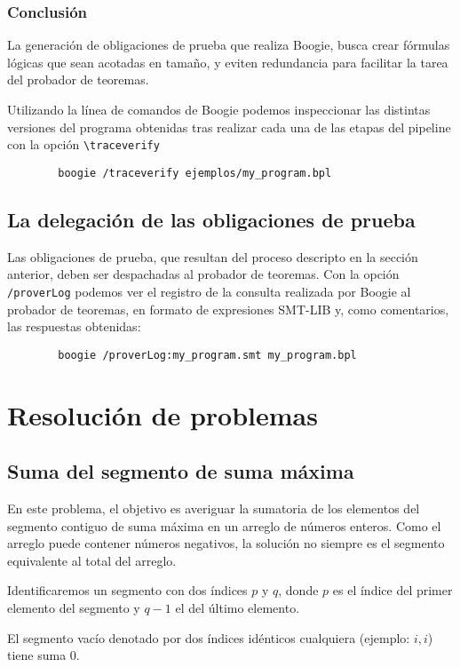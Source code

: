 \documentclass[12pt, a4paper, openany, fleqn]{book}
\begin{document}
    \subsection*{Conclusión}

    La generación de obligaciones de prueba que realiza Boogie, busca crear fórmulas lógicas que sean acotadas en tamaño, y eviten redundancia para facilitar la tarea del probador de teoremas.
  
    Utilizando la línea de comandos de Boogie podemos inspeccionar las distintas versiones del programa obtenidas tras realizar cada una de las etapas del pipeline con la opción \verb|\traceverify|
    \begin{verbatim}
        boogie /traceverify ejemplos/my_program.bpl
    \end{verbatim}

    \section{La delegación de las obligaciones de prueba}
    Las obligaciones de prueba, que resultan del proceso descripto en la sección anterior, deben ser despachadas al probador de teoremas.
    Con la opción \verb|/proverLog| podemos ver el registro de la consulta realizada por Boogie al probador de teoremas, en formato de expresiones SMT-LIB y, como comentarios, las respuestas obtenidas:
    \begin{verbatim}
        boogie /proverLog:my_program.smt my_program.bpl
    \end{verbatim}


    \chapter{Resolución de problemas}
    \section{Suma del segmento de suma máxima}
    En este problema, el objetivo es averiguar la sumatoria de los elementos del segmento contiguo de suma máxima en un arreglo de números enteros.
    Como el arreglo puede contener números negativos, la solución no siempre es el segmento equivalente al total del arreglo.

    Identificaremos un segmento con dos índices $p$ y $q$, donde $p$ es el índice del primer elemento del segmento y $q-1$ el del último elemento.

    El segmento vacío denotado por dos índices idénticos cualquiera (ejemplo: $i,i$) tiene suma 0.
\end{document}
